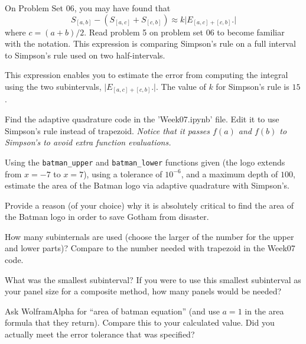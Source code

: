 \documentclass[12pt,letterpaper,noanswers]{exam}
\begin{document}
\begin{questions}
On Problem Set 06, you may have found that \[S_{[a,b]}-\left(S_{[a,c]}+S_{[c,b]}\right) \approx k\vert E_{[a,c]+[c,b]}.\vert\]
where $c = (a+b)/2$.  Read problem 5 on problem set 06 to become familiar with the notation.  This expression is comparing Simpson's rule on a full interval to Simpson's rule used on two half-intervals.

This expression enables you to estimate the error from computing the integral using the two subintervals, $\vert E_{[a,c]+[c,b]}.\vert$.  The value of $k$ for Simpson's rule is $15$.

\begin{parts}
\item Find the adaptive quadrature code in the 'Week07.ipynb' file.  Edit it to use Simpson's rule instead of trapezoid.  \emph{Notice that it passes $f(a)$ and $f(b)$ to Simpson's to avoid extra function evaluations.}


\item Using the \texttt{batman\_upper} and \texttt{batman\_lower} functions given (the logo extends from $x=-7$ to $x=7$), using a tolerance of $10^{-6}$, and a maximum depth of $100$, estimate the area of the Batman logo via adaptive quadrature with Simpson's.

\item Provide a reason (of your choice) why it is absolutely critical to find the area of the Batman logo in order to save Gotham from disaster.


How many subinternals are used (choose the larger of the number for the upper and lower parts)?  Compare to the number needed with trapezoid in the Week07 code.

What was the smallest subinterval?  If you were to use this smallest subinterval as your panel size for a composite method, how many panels would be needed?

\item Ask WolframAlpha for ``area of batman equation'' (and use $a=1$ in the area formula that they return).  Compare this to your calculated value.  Did you actually meet the error tolerance that was specified?
\end{parts}



\end{questions}
\end{document}
